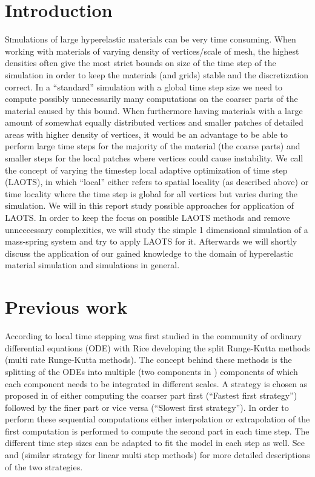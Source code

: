 \documentclass[twoside]{article}
\begin{document}
\begin{multicols}{2} %

\section{Introduction}
\lettrine[nindent=0em,lines=3]{S} imulations of large hyperelastic materials
can be very time consuming. When working with materials of varying density
of vertices/scale of mesh, the highest densities often give the most
strict bounds on size of the time step of the simulation in order to keep
the materials (and grids) stable and the discretization correct. In a
``standard'' simulation with a global time step size we need to compute
possibly unnecessarily many computations on the coarser parts of the material
caused by this bound. When furthermore having materials with a large amount
of somewhat equally distributed vertices and smaller patches of detailed
areas with higher density of vertices, it would be an advantage to be able
to perform large time steps for the majority of the material (the coarse
parts) and smaller steps for the local patches where vertices could cause
instability. We call the concept of varying the timestep local adaptive
optimization of time step (LAOTS), in which ``local'' either refers to spatial
locality (as described above) or time locality where the time step is global
for all vertices but varies during the simulation. We will in this report
study possible approaches for application of LAOTS. In order to keep the focus
on possible LAOTS methods and remove unneccessary complexities, we will study
the simple 1 dimensional simulation of a mass-spring system and try to apply
LAOTS for it. Afterwards we will shortly discuss the application of our gained
knowledge to the domain of hyperelastic material simulation and simulations
in general.


\section{Previous work}
According to \cite{Gander:2013} local time stepping was first studied
in the community of ordinary differential equations (ODE) with Rice
\cite{rice:1960} developing the split Runge-Kutta methods (multi rate
Runge-Kutta methods). The concept behind these methods is the splitting of
the ODEs into multiple (two components in \cite{rice:1960}) components of
which each component needs to be integrated in different scales. A strategy
is chosen as proposed in \cite{Kvaernoe:1999} of either computing the coarser
part first (``Fastest first strategy'') followed by the finer part or vice
versa (``Slowest first strategy''). In order to perform these sequential
computations either interpolation or extrapolation of the first computation
is performed to compute the second part in each time step. The different
time step sizes can be adapted to fit the model in each step as well. See
\cite{Kvaernoe:1999} and \cite{Gear:1984} (similar strategy for linear multi
step methods) for more detailed descriptions of the two strategies.


\end{multicols}
\end{document}
